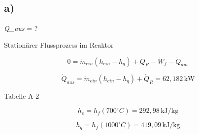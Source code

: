 

\subsection*{a)}
\textit{Q\_aus} = ?

Stationärer Flussprozess im Reaktor

\[
0 = \dot{m}_{ein} (h_{ein} - h_{q}) + \dot{Q}_R - \dot{W}_f - \dot{Q}_{aus}
\]

\[
\dot{Q}_{aus} = \dot{m}_{ein} (h_{ein} - h_{q}) + \dot{Q}_R = 62,182 \, \text{kW}
\]

Tabelle A-2

\[
h_e = h_f (700^\circ C) = 292,98 \, \text{kJ/kg}
\]

\[
h_q = h_f (1000^\circ C) = 419,09 \, \text{kJ/kg}
\]